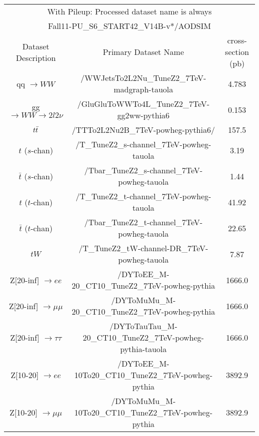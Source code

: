 \begin{table}[!ht]
\begin{center}
{\footnotesize
\begin{tabular}{|c|c|c|}
\hline
\multicolumn{3}{|c|}{With Pileup: Processed dataset name is always} \\
\multicolumn{3}{|c|}{Fall11-PU\_S6\_START42\_V14B-v*/AODSIM} \\
\hline
 Dataset Description                     &   Primary Dataset Name   & cross-section (pb)\\
\hline
qq $\rightarrow WW$                  	 &   /WWJetsTo2L2Nu\_TuneZ2\_7TeV-madgraph-tauola                      &  4.783 \\
gg $\rightarrow WW \to 2l 2\nu$          &   /GluGluToWWTo4L\_TuneZ2\_7TeV-gg2ww-pythia6                       &   0.153\\
$t\bar{t}$                              	 &   /TTTo2L2Nu2B\_7TeV-powheg-pythia6/                                &  157.5 \\
$t$ ($s$-chan)                 	 	 &   /T\_TuneZ2\_s-channel\_7TeV-powheg-tauola                         &  3.19 \\
$\bar{t}$ ($s$-chan)                 	 &   /Tbar\_TuneZ2\_s-channel\_7TeV-powheg-tauola                      &  1.44 \\
$t$ ($t$-chan)             	 	 &   /T\_TuneZ2\_t-channel\_7TeV-powheg-tauola                         &  41.92 \\
$\bar{t}$ ($t$-chan)                 	 &   /Tbar\_TuneZ2\_t-channel\_7TeV-powheg-tauola                      &  22.65 \\
$tW$                                     &   /T\_TuneZ2\_tW-channel-DR\_7TeV-powheg-tauola                     &  7.87 \\
Z[20-inf] $\rightarrow ee$	  	 &   /DYToEE\_M-20\_CT10\_TuneZ2\_7TeV-powheg-pythia                   &  1666.0 \\
Z[20-inf] $\rightarrow \mu\mu$        	 &   /DYToMuMu\_M-20\_CT10\_TuneZ2\_7TeV-powheg-pythia                 &  1666.0 \\	       
Z[20-inf] $\rightarrow \tau\tau$  	 &   /DYToTauTau\_M-20\_CT10\_TuneZ2\_7TeV-powheg-pythia-tauola        &  1666.0 \\
Z[10-20]  $\rightarrow ee$	  	 &   /DYToEE\_M-10To20\_CT10\_TuneZ2\_7TeV-powheg-pythia               &  3892.9 \\
Z[10-20]  $\rightarrow \mu\mu$    	 &   /DYToMuMu\_M-10To20\_CT10\_TuneZ2\_7TeV-powheg-pythia             &  3892.9 \\

\end{tabular}}
\end{center}
\end{table}
